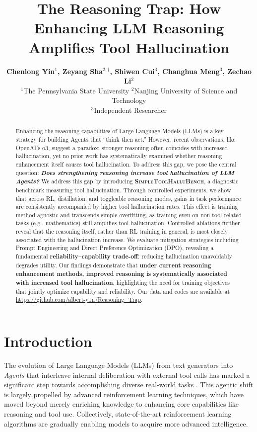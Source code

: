 \documentclass[11pt]{article}
\title{The Reasoning Trap: How Enhancing LLM Reasoning Amplifies Tool Hallucination}
\author{
  \textbf{Chenlong Yin$^1$, Zeyang Sha$^{2,\dag}$, Shiwen Cui$^3$, Changhua Meng$^3$, Zechao Li$^2$} \\[1em]
  \normalfont $^1$The Pennsylvania State University $^2$Nanjing University of Science and Technology \\ $^3$Independent Researcher
}
\begin{document}
\maketitle

\renewcommand{\thefootnote}{\fnsymbol{footnote}}

\begin{abstract}
Enhancing the reasoning capabilities of Large Language Models (LLMs) is a key strategy for building Agents that ``think then act.'' However, recent observations, like OpenAI's o3, suggest a paradox: stronger reasoning often coincides with increased hallucination, yet no prior work has systematically examined whether reasoning enhancement itself causes tool hallucination. To address this gap, we pose the central question: \textbf{\emph{Does strengthening reasoning increase tool hallucination of LLM Agents?}} We address this gap by introducing \textbf{\textsc{SimpleToolHalluBench}}, a diagnostic benchmark measuring tool hallucination. Through controlled experiments, we show that across RL, distillation, and toggleable reasoning modes, gains in task performance are consistently accompanied by higher tool hallucination rates. This effect is training method-agnostic and transcends simple overfitting, as training even on non-tool-related tasks (e.g., mathematics) still amplifies tool hallucination. Controlled ablations further reveal that the reasoning itself, rather than RL training in general, is most closely associated with the hallucination increase. We evaluate mitigation strategies including Prompt Engineering and Direct Preference Optimization (DPO), revealing a fundamental \textbf{reliability--capability trade-off}: reducing hallucination unavoidably degrades utility. Our findings demonstrate that \textbf{under current reasoning enhancement methods, improved reasoning is systematically associated with increased tool hallucination}, highlighting the need for training objectives that jointly optimize capability and reliability. Our data and codes are available at \href{https://github.com/albert-y1n/Reasoning_Trap}{https://github.com/albert-y1n/Reasoning\_Trap}.
\end{abstract}

\section{Introduction}

The evolution of Large Language Models (LLMs) from text generators into \emph{Agents} that interleave internal deliberation with external tool calls has marked a significant step towards accomplishing diverse real-world tasks \citep{wei2022chain,trivedi2023interleaving,yao2023react,schick2024toolformer,sha2025agenteffiecnt}. This agentic shift is largely propelled by advanced reinforcement learning techniques, which have moved beyond merely enriching knowledge to enhancing core capabilities like reasoning and tool use. Collectively, state-of-the-art reinforcement learning algorithms are gradually enabling models to acquire more advanced intelligence.
\end{document}
